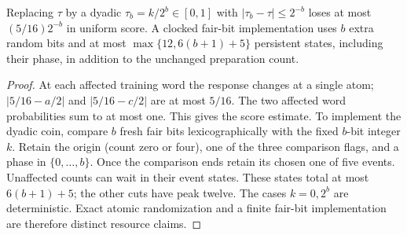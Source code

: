 \begin{proposition}\label{prop:tau-precision}
Replacing $\tau$ by a dyadic $\tau_b=k/2^b\in[0,1]$ with
$|\tau_b-\tau|\le2^{-b}$ loses at most $(5/16)2^{-b}$ in uniform score.
A clocked fair-bit implementation uses $b$ extra random bits and at most
$\max\{12,6(b+1)+5\}$ persistent states, including their phase, in
addition to the unchanged preparation count.
\end{proposition}
\begin{proof}
At each affected training word the response changes at a single atom;
$|5/16-a/2|$ and $|5/16-c/2|$ are at most $5/16$.
The two affected word probabilities sum to at most one. This gives the
score estimate. To implement the dyadic coin, compare $b$ fresh fair
bits lexicographically with the fixed $b$-bit integer $k$. Retain the
origin (count zero or four), one of the three comparison flags, and a
phase in $\{0,\ldots,b\}$. Once the comparison ends retain its chosen
one of five events. Unaffected counts can wait in their event states.
These states total at most $6(b+1)+5$; the other cuts have peak twelve.
The cases $k=0,2^b$ are deterministic. Exact atomic randomization and a
finite fair-bit implementation are therefore distinct resource claims.
\end{proof}
